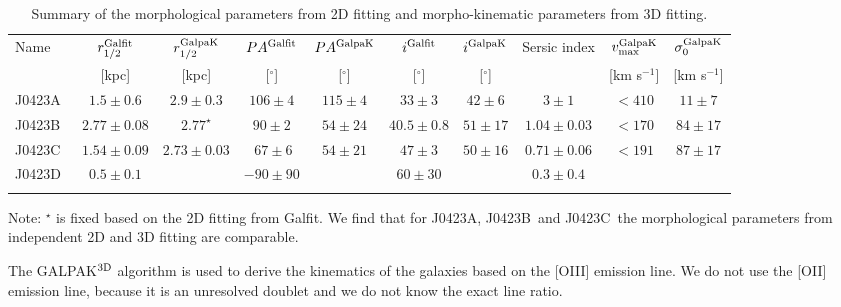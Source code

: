 \documentclass[a4paper,fleqn,usenatbib]{mnras}
\newcommand{\GalA}{J0423A}
\newcommand{\GalB}{J0423B}
\newcommand{\GalC}{J0423C}
\newcommand{\GalD}{J0423D}
\begin{document}
{\begin{table*}
\begin{minipage}{\linewidth}
\centering
\caption{Summary of the morphological parameters from 2D fitting and morpho-kinematic parameters from 3D fitting.}
\label{TabParamGalfit}
\label{TabKinematicParam}
\begin{tabular}{l c c c c c c c c c}
\hline
Name & $r_{1/2}^{\rm Galfit}$ & $r_{1/2}^{\rm GalpaK}$ & $PA^{\rm Galfit}$ & $PA^{\rm GalpaK}$ & $i^{\rm Galfit}$ & $i^{\rm GalpaK}$ & Sersic index & $v_{\rm max}^{\rm GalpaK}$ & $\sigma_0^{\rm GalpaK}$\\
&[kpc] & [kpc] & [$^{\circ}$] & [$^{\circ}$] & [$^{\circ}$] & [$^{\circ}$] & & [km s$^{-1}$] & [km s$^{-1}$]\\
\hline
\GalA\ & $1.5 \pm 0.6$ & $2.9 \pm 0.3$ & $106 \pm 4$ & $115 \pm 4$ & $33 \pm 3$ &  $42 \pm 6$ & $3 \pm 1$ &$< 410$ & $11 \pm 7$ \\
\GalB\ & $2.77 \pm 0.08$ & $2.77^{\star}$ & $90 \pm 2$ & $54 \pm 24$ & $ 40.5 \pm 0.8 $ & $51 \pm 17$ & $1.04 \pm 0.03$ & $<170$ & $84 \pm 17$\\
\GalC\ & $1.54 \pm 0.09$ & $2.73 \pm 0.03$ & $\: 67 \pm 6$ & $54 \pm 21$ & $47 \pm 3$ & $50 \pm 16$ & $0.71 \pm 0.06$ & $<191$ & $87 \pm 17$ \\
\GalD\ & $0.5 \pm 0.1$ & & $-90 \pm 90$ & & $60 \pm 30$ & & $0.3 \pm 0.4$\\
\hline\\
\end{tabular}
\end{minipage}
\begin{minipage}{\linewidth}
Note: $^{\star}$ is fixed based on the 2D fitting from {\sc Galfit}. We find that for \GalA, \GalB\ and \GalC\ the morphological parameters from independent 2D and 3D fitting are comparable.
\end{minipage}
\end{table*}


\label{SecLineWidthMEx}





The GALPAK$^{\rm 3D}$ algorithm is used to derive the kinematics of the galaxies based on the [OIII] emission line. We do not use the [OII] emission line, because it is an unresolved doublet and we do not know the exact line ratio.

}
\end{document}
